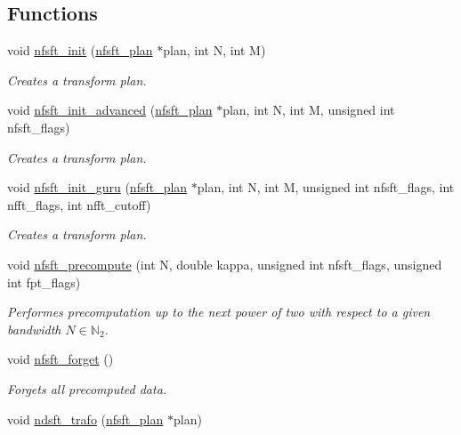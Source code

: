 \subsection*{Functions}
\begin{CompactItemize}
\item 
void \hyperlink{group__nfsft_ga1}{nfsft\_\-init} (\hyperlink{structnfsft__plan}{nfsft\_\-plan} $\ast$plan, int N, int M)
\begin{CompactList}\small\item\em Creates a transform plan. \item\end{CompactList}\item 
void \hyperlink{group__nfsft_ga2}{nfsft\_\-init\_\-advanced} (\hyperlink{structnfsft__plan}{nfsft\_\-plan} $\ast$plan, int N, int M, unsigned int nfsft\_\-flags)
\begin{CompactList}\small\item\em Creates a transform plan. \item\end{CompactList}\item 
void \hyperlink{group__nfsft_ga3}{nfsft\_\-init\_\-guru} (\hyperlink{structnfsft__plan}{nfsft\_\-plan} $\ast$plan, int N, int M, unsigned int nfsft\_\-flags, int nfft\_\-flags, int nfft\_\-cutoff)
\begin{CompactList}\small\item\em Creates a transform plan. \item\end{CompactList}\item 
void \hyperlink{group__nfsft_ga4}{nfsft\_\-precompute} (int N, double kappa, unsigned int nfsft\_\-flags, unsigned int fpt\_\-flags)
\begin{CompactList}\small\item\em Performes precomputation up to the next power of two with respect to a given bandwidth $N \in \mathbb{N}_2$. \item\end{CompactList}\item 
void \hyperlink{group__nfsft_ga5}{nfsft\_\-forget} ()
\begin{CompactList}\small\item\em Forgets all precomputed data. \item\end{CompactList}\item 
void \hyperlink{group__nfsft_ga6}{ndsft\_\-trafo} (\hyperlink{structnfsft__plan}{nfsft\_\-plan} $\ast$plan)

\end{CompactItemize}
